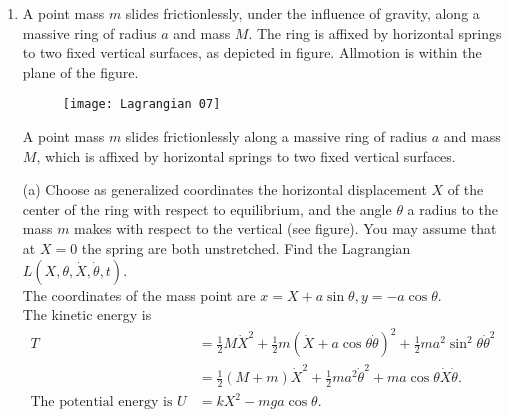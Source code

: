 \begin{enumerate}
\begin{answer}
\begin{align*}
\intertext{The second equation can be integrated once to yield $\dot{y}=\omega_{c}\left(x_{0}-x\right)$, where $x_{0}$ is a constant. Substituting this into the first equation gives}
\ddot{x}+\omega_{c}^{2} x&=\omega_{c}^{2} x_{0}+\frac{e}{m} E_{0} .
\intertext{This is the equation of a constantly forced harmonic oscillator. We can therefore write the generalsolution as}
x(t)&=x_{0}+\frac{e E_{0}}{m \omega_{c}^{2}}+A \cos \left(\omega_{c} t+\delta\right) \\
y(t)&=y_{0}-\frac{e E_{0}}{m \omega_{c}} t-A \sin \left(\omega_{c} t+\delta\right) \\
z(t)&=z_{0}+\dot{z}_{0} t
\intertext{Note that there are six constants, $\left\{A, \delta, x_{0}, y_{0}, z_{0}, \dot{z}_{0}\right\}$, are required for the general solution of three coupled second order ODEs.}
	\end{align*}
\end{answer}
\item A point mass $m$ slides frictionlessly, under the influence of gravity, along a massive ring of radius $a$ and mass $M$. The ring is affixed by horizontal springs to two fixed vertical surfaces, as depicted in figure. Allmotion is within the plane of the figure.
\begin{figure}[H]
	\centering
	\texttt{[image: Lagrangian 07]}
\end{figure}
A point mass $m$ slides frictionlessly along a massive ring of radius $a$ and mass $M$, which is affixed by horizontal springs to two fixed vertical surfaces.
\begin{answer}
	(a) Choose as generalized coordinates the horizontal displacement $X$ of the center of the ring with respect to equilibrium, and the angle $\theta$ a radius to the mass $m$ makes with respect to the vertical (see figure). You may assume that at $X=0$ the spring are both unstretched. Find the Lagrangian $L(X, \theta, \dot{X}, \dot{\theta}, t)$.\\
	The coordinates of the mass point are $x=X+a \sin \theta, y=-a \cos \theta$.\\
	The kinetic energy is
	\begin{align*}
T &=\frac{1}{2} M \dot{X}^{2}+\frac{1}{2} m(\dot{X}+a \cos \theta \dot{\theta})^{2}+\frac{1}{2} m a^{2} \sin ^{2} \theta \dot{\theta}^{2} \\ &=\frac{1}{2}(M+m) \dot{X}^{2}+\frac{1}{2} m a^{2} \dot{\theta}^{2}+m a \cos \theta \dot{X} \dot{\theta} .\\
\text{The potential energy is }U&=k X^{2}-m g a \cos \theta.\\

\end{align*}
\end{answer}
\end{enumerate}
